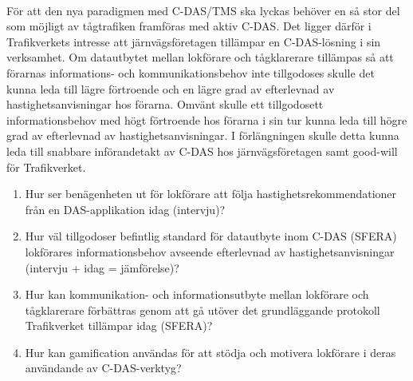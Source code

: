 \paragraph{}
\hspace{-11}För att den nya paradigmen med C-DAS/TMS ska lyckas behöver en så stor del som möjligt av tågtrafiken framföras med aktiv C-DAS\@.
Det ligger därför i Trafikverkets intresse att järnvägsföretagen tillämpar en C-DAS-lösning i sin verksamhet.
Om datautbytet mellan lokförare och tågklarerare tillämpas så att förarnas informations- och kommunikationsbehov inte tillgodoses skulle det kunna leda till lägre förtroende och en lägre grad av efterlevnad av hastighetsanvisningar hos förarna.
Omvänt skulle ett tillgodosett informationsbehov med högt förtroende hos förarna i sin tur kunna leda till högre grad av efterlevnad av hastighetsanvisningar.
I förlängningen skulle detta kunna leda till snabbare införandetakt av C-DAS hos järnvägsföretagen samt good-will för Trafikverket.
\begin{enumerate}
    \item Hur ser benägenheten ut för lokförare att följa hastighetsrekommendationer från en DAS-applikation idag (intervju)?
    \item Hur väl tillgodoser befintlig standard för datautbyte inom C-DAS (SFERA) lokförares informationsbehov avseende efterlevnad av hastighetsanvisningar (intervju + idag = jämförelse)?
    \item Hur kan kommunikation- och informationsutbyte mellan lokförare och tågklarerare förbättras genom att gå utöver det grundläggande protokoll Trafikverket tillämpar idag (SFERA)?
    \item Hur kan gamification användas för att stödja och motivera lokförare i deras användande av C-DAS-verktyg?
\end{enumerate}